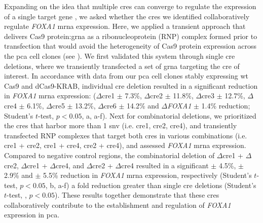 Expanding on the idea that multiple \glspl{cre} can converge to regulate the expression of a single target gene \cite{sallariConvergenceDispersedRegulatory2016,baileyNoncodingSomaticInherited2016,pennacchioEnhancersFiveEssential2013}, we asked whether the \glspl{cre} we identified collaboratively regulate \emph{FOXA1} \gls{mrna} expression.
Here, we applied a transient approach that delivers Cas9 protein:\gls{grna} as a ribonucleoprotein (RNP) complex formed prior to transfection that would avoid the heterogeneity of Cas9 protein expression across the \gls{pca} cell clones (see ).
We first validated this system through single \gls{cre} deletions, where we transiently transfected a set of \gls{grna} targeting the \gls{cre} of interest.
In accordance with data from our \gls{pca} cell clones stably expressing \gls{wt} Cas9 and dCas9-KRAB, individual \gls{cre} deletion resulted in a significant reduction in \emph{FOXA1} \gls{mrna} expression: ($\Delta$\gls{cre}1  $\pm$ 7.3\%, $\Delta$\gls{cre}2  $\pm$ 11.8\%, $\Delta$\gls{cre}3  $\pm$ 12.7\%, $\Delta$\gls{cre}4  $\pm$ 6.1\%, $\Delta$\gls{cre}5  $\pm$ 13.2\%, $\Delta$\gls{cre}6  $\pm$ 14.2\% and $\Delta$\emph{FOXA1}  $\pm$ 1.4\% reduction; Student's $t$-test, $p < 0.05$, a, a-f).
Next for combinatorial deletions, we prioritized the \glspl{cre} that harbor more than 1 \gls{snv} (i.e. \gls{cre}1, \gls{cre}2, \gls{cre}4), and transiently transfected RNP complexes that target both \glspl{cre} in various combinations (i.e. \gls{cre}1 + \gls{cre}2, \gls{cre}1 + \gls{cre}4, \gls{cre}2 + \gls{cre}4), and assessed \emph{FOXA1} \gls{mrna} expression.
Compared to negative control regions, the combinatorial deletion of $\Delta$\gls{cre}1 + $\Delta$\gls{cre}2, $\Delta$\gls{cre}1 + $\Delta$\gls{cre}4, and $\Delta$\gls{cre}2 + $\Delta$\gls{cre}4 resulted in a significant  $\pm$ 4.5\%,  $\pm$ 2.9\% and  $\pm$ 5.5\% reduction in \emph{FOXA1} \gls{mrna} expression, respectively (Student's $t$-test, $p<0.05$, b, a-f) a fold reduction greater than single \gls{cre} deletions (Student's $t$-test, , $p<0.05$).
These results together demonstrate that these \glspl{cre} collaboratively contribute to the establishment and regulation of \emph{FOXA1} expression in \gls{pca}.

